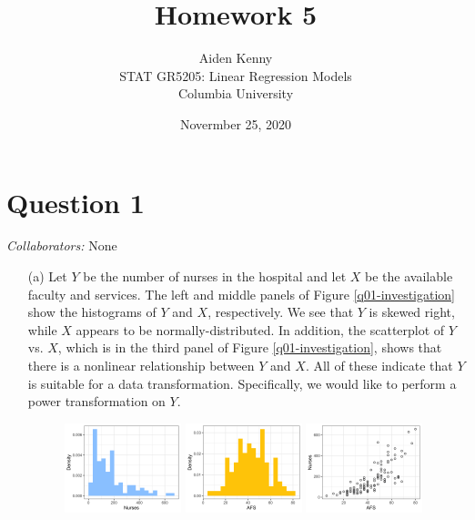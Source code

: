 \documentclass[10pt]{article}
\title{
    {\Large Homework 5}
}
\author{
    {\normalsize Aiden Kenny}\\
    {\normalsize STAT GR5205: Linear Regression Models}\\
    {\normalsize Columbia University}
}
\date{\normalsize Novermber 25, 2020}
\newcommand{\mycolaba}[1]{\textcolor{colabcol}{\textsl{Collaborators:}} #1}
\begin{document}
\maketitle

\newcommand{\myg}{\mathbf{g}_{\lambda}}
\newcommand{\mygfull}{\mathbf{g}_{\lambda}(\mathbf{y})}
\section{Question 1} \noindent
\mycolaba{None}
\begin{itemize}
    \item[(a)] Let \(Y\) be the number of nurses in the hospital and let \(X\) be the available faculty and services. 
    The left and middle panels of Figure \ref{q01-investigation} show the histograms of \(Y\) and \(X\), respectively. We see that \(Y\) is skewed right, while 
    \(X\) appears to be normally-distributed. In addition, the scatterplot of \(Y\) vs. \(X\), which is in the third panel of Figure 
    \ref{q01-investigation}, shows that there is a nonlinear relationship between \(Y\) and \(X\). 
    All of these indicate that \(Y\) is suitable for a data transformation. Specifically, we would like to perform a 
    power transformation on \(Y\). 
    \begin{figure}[ht]
        \centering
        \includegraphics[width = 0.32\textwidth]{img/q01-nurses-hist-original.png}
        \includegraphics[width = 0.32\textwidth]{img/q01-afs-hist-original.png}
        \includegraphics[width = 0.32\textwidth]{img/q01-scatterplot-blank.png}

\end{figure}
\end{itemize}
\end{document}
